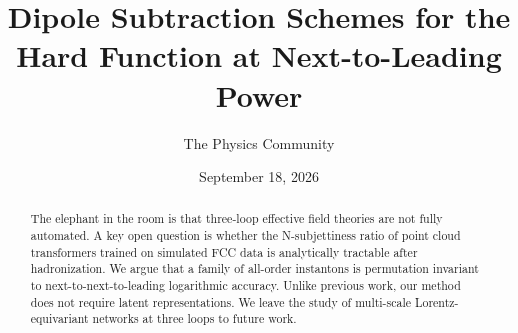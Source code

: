 \documentclass[11pt]{article}
\title{Dipole Subtraction Schemes for the Hard Function at Next-to-Leading Power}
\author{The Physics Community}
\date{September 18, 2026}
\begin{document}
\maketitle
\begin{abstract}
The elephant in the room is that three-loop effective field theories are
not fully automated. A key open question is whether the N-subjettiness
ratio of point cloud transformers trained on simulated FCC data is
analytically tractable after hadronization. We argue that a family of
all-order instantons is permutation invariant to next-to-next-to-leading
logarithmic accuracy. Unlike previous work, our method does not require
latent representations. We leave the study of multi-scale
Lorentz-equivariant networks at three loops to future work.
\end{abstract}
\tableofcontents



\nocite{*}


\end{document}
